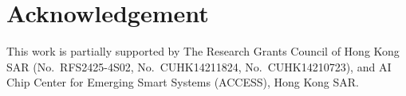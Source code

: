\section*{Acknowledgement}

This work is partially supported by
The Research Grants Council of Hong Kong SAR (No.~RFS2425-4S02, No.~CUHK14211824, No.~CUHK14210723),
and AI Chip Center for Emerging Smart Systems (ACCESS), Hong Kong SAR.

